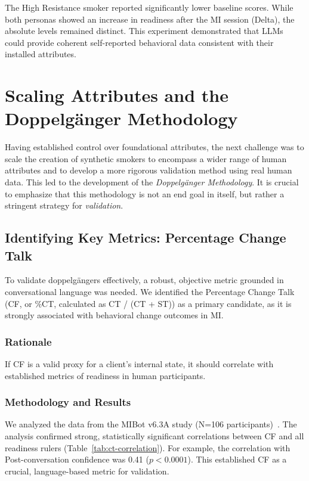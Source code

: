 The High Resistance smoker reported significantly lower baseline scores. While both personas showed an increase in readiness after the MI session (Delta), the absolute levels remained distinct. This experiment demonstrated that LLMs could provide coherent self-reported behavioral data consistent with their installed attributes.

\section{Scaling Attributes and the Doppelgänger Methodology}
\label{sec:synthetic-smoker-doppelganger}

Having established control over foundational attributes, the next challenge was to scale the creation of synthetic smokers to encompass a wider range of human attributes and to develop a more rigorous validation method using real human data. This led to the development of the \textit{Doppelgänger Methodology}. It is crucial to emphasize that this methodology is not an end goal in itself, but rather a stringent strategy for \textit{validation}.

\subsection{Identifying Key Metrics: Percentage Change Talk}

To validate doppelgängers effectively, a robust, objective metric grounded in conversational language was needed. We identified the Percentage Change Talk (CF, or \%CT, calculated as CT / (CT + ST)) as a primary candidate, as it is strongly associated with behavioral change outcomes in MI.

\subsubsection{Rationale}
If CF is a valid proxy for a client's internal state, it should correlate with established metrics of readiness in human participants.

\subsubsection{Methodology and Results}
We analyzed the data from the MIBot v6.3A study (N=106 participants)~\citep{mahmood-etal-2025-fully}. The analysis confirmed strong, statistically significant correlations between CF and all readiness rulers (Table~\ref{tab:ct-correlation}). For example, the correlation with Post-conversation confidence was 0.41 ($p < 0.0001$). This established CF as a crucial, language-based metric for validation.

